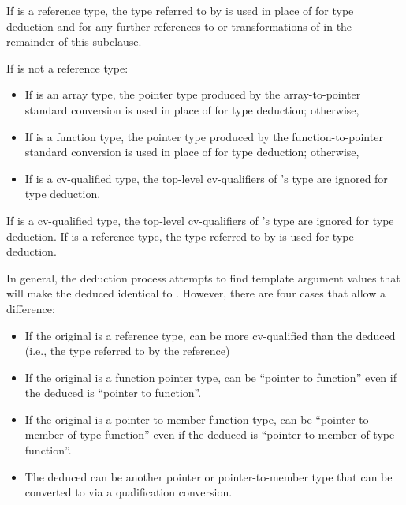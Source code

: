 \pnum
If  is a reference type, the type referred to by  is used in place
of  for type deduction and for any further references to or transformations of
 in the remainder of this subclause.

\pnum
If
is not a reference type:

\begin{itemize}
\item
If
is an array type, the pointer type produced by the
array-to-pointer standard conversion is used in place of
for type
deduction; otherwise,
\item
If
is a function type, the pointer type produced by the
function-to-pointer standard conversion is used in place of
for
type deduction; otherwise,
\item
If
is a cv-qualified type, the top-level cv-qualifiers of
's
type are ignored for type deduction.
\end{itemize}

\pnum
If
is a cv-qualified type, the top-level cv-qualifiers of
's
type are ignored for type deduction.
If
is a
reference type, the type referred to by
is used for type deduction.

\pnum
In general, the deduction process attempts to find template argument
values that will make the deduced
identical to
.
However, there are four cases that allow a difference:

\begin{itemize}
\item
If the original  is a reference type,
 can be more cv-qualified than the deduced 
(i.e., the type referred to by the reference)
\item
If the original  is a function pointer type,
 can be ``pointer to function''
even if the deduced  is ``pointer to  function''.
\item
If the original  is a pointer-to-member-function type,
 can be ``pointer to member of type function''
even if the deduced  is ``pointer to member of type  function''.
\item
The deduced 
can be another pointer or pointer-to-member type that
can be converted to  via a qualification conversion.
\end{itemize}

